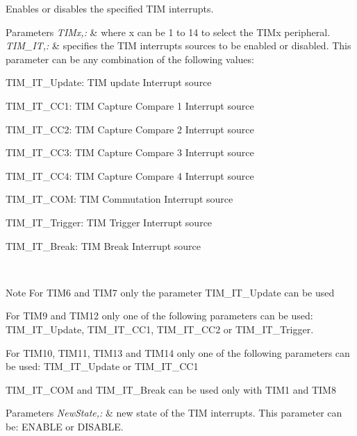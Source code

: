 Enables or disables the specified T\-I\-M interrupts. 


\begin{DoxyParams}{Parameters}
{\em T\-I\-Mx,\-:} & where x can be 1 to 14 to select the T\-I\-Mx peripheral. \\
\hline
{\em T\-I\-M\-\_\-\-I\-T,\-:} & specifies the T\-I\-M interrupts sources to be enabled or disabled. This parameter can be any combination of the following values\-: \begin{DoxyItemize}
\item T\-I\-M\-\_\-\-I\-T\-\_\-\-Update\-: T\-I\-M update Interrupt source \item T\-I\-M\-\_\-\-I\-T\-\_\-\-C\-C1\-: T\-I\-M Capture Compare 1 Interrupt source \item T\-I\-M\-\_\-\-I\-T\-\_\-\-C\-C2\-: T\-I\-M Capture Compare 2 Interrupt source \item T\-I\-M\-\_\-\-I\-T\-\_\-\-C\-C3\-: T\-I\-M Capture Compare 3 Interrupt source \item T\-I\-M\-\_\-\-I\-T\-\_\-\-C\-C4\-: T\-I\-M Capture Compare 4 Interrupt source \item T\-I\-M\-\_\-\-I\-T\-\_\-\-C\-O\-M\-: T\-I\-M Commutation Interrupt source \item T\-I\-M\-\_\-\-I\-T\-\_\-\-Trigger\-: T\-I\-M Trigger Interrupt source \item T\-I\-M\-\_\-\-I\-T\-\_\-\-Break\-: T\-I\-M Break Interrupt source\end{DoxyItemize}
\\
\hline
\end{DoxyParams}
\begin{DoxyNote}{Note}
For T\-I\-M6 and T\-I\-M7 only the parameter T\-I\-M\-\_\-\-I\-T\-\_\-\-Update can be used 

For T\-I\-M9 and T\-I\-M12 only one of the following parameters can be used\-: T\-I\-M\-\_\-\-I\-T\-\_\-\-Update, T\-I\-M\-\_\-\-I\-T\-\_\-\-C\-C1, T\-I\-M\-\_\-\-I\-T\-\_\-\-C\-C2 or T\-I\-M\-\_\-\-I\-T\-\_\-\-Trigger. 

For T\-I\-M10, T\-I\-M11, T\-I\-M13 and T\-I\-M14 only one of the following parameters can be used\-: T\-I\-M\-\_\-\-I\-T\-\_\-\-Update or T\-I\-M\-\_\-\-I\-T\-\_\-\-C\-C1 

T\-I\-M\-\_\-\-I\-T\-\_\-\-C\-O\-M and T\-I\-M\-\_\-\-I\-T\-\_\-\-Break can be used only with T\-I\-M1 and T\-I\-M8
\end{DoxyNote}

\begin{DoxyParams}{Parameters}
{\em New\-State,\-:} & new state of the T\-I\-M interrupts. This parameter can be\-: E\-N\-A\-B\-L\-E or D\-I\-S\-A\-B\-L\-E. \\
\hline
\end{DoxyParams}

